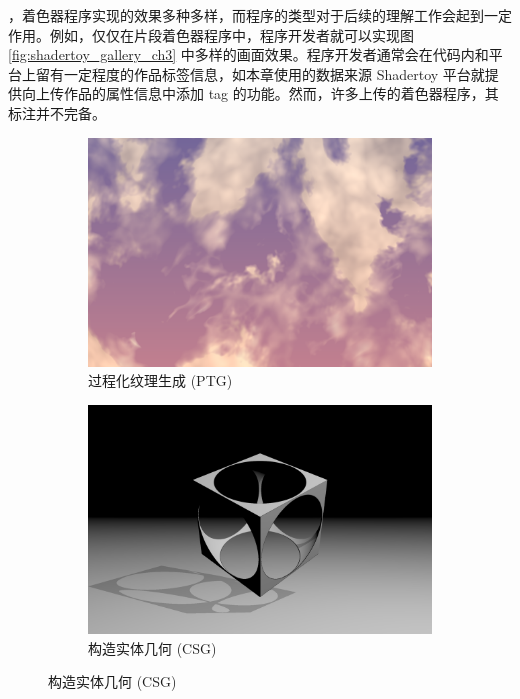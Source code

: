 {，着色器程序实现的效果多种多样，而程序的类型对于后续的理解工作会起到一定作用。例如，仅仅在片段着色器程序中，程序开发者就可以实现图 \ref{fig:shadertoy_gallery_ch3} 中多样的画面效果。程序开发者通常会在代码内和平台上留有一定程度的作品标签信息，如本章使用的数据来源 Shadertoy 平台就提供向上传作品的属性信息中添加 tag 的功能。然而，许多上传的着色器程序，其标注并不完备。

\begin{figure}[htbp]
  \centering
  \begin{minipage}[b]{\textwidth}
      \begin{subfigure}[b]{0.48\textwidth}
          \includegraphics[width=\textwidth]{figures/shadertoy_cloud.png}
          \caption{过程化纹理生成 (PTG)}
          \label{fig:sub_textgen}
      \end{subfigure}
      \hfill %
      \begin{subfigure}[b]{0.48\textwidth}
          \includegraphics[width=\textwidth]{figures/shadertoy_csg.png}
          \caption{构造实体几何 (CSG)}
          \label{fig:sub_csg}
      \end{subfigure}
  \end{minipage}
  

\end{figure}}
